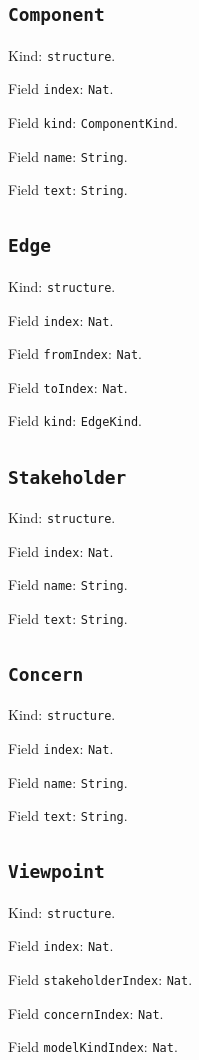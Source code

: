 \documentclass[11pt]{article}
\begin{document}
\subsection*{\texttt{Component}}
\noindent Kind: \texttt{structure}.\par
\noindent Field \texttt{index}: \texttt{Nat}.\par
\noindent Field \texttt{kind}: \texttt{ComponentKind}.\par
\noindent Field \texttt{name}: \texttt{String}.\par
\noindent Field \texttt{text}: \texttt{String}.\par
\subsection*{\texttt{Edge}}
\noindent Kind: \texttt{structure}.\par
\noindent Field \texttt{index}: \texttt{Nat}.\par
\noindent Field \texttt{fromIndex}: \texttt{Nat}.\par
\noindent Field \texttt{toIndex}: \texttt{Nat}.\par
\noindent Field \texttt{kind}: \texttt{EdgeKind}.\par
\subsection*{\texttt{Stakeholder}}
\noindent Kind: \texttt{structure}.\par
\noindent Field \texttt{index}: \texttt{Nat}.\par
\noindent Field \texttt{name}: \texttt{String}.\par
\noindent Field \texttt{text}: \texttt{String}.\par
\subsection*{\texttt{Concern}}
\noindent Kind: \texttt{structure}.\par
\noindent Field \texttt{index}: \texttt{Nat}.\par
\noindent Field \texttt{name}: \texttt{String}.\par
\noindent Field \texttt{text}: \texttt{String}.\par
\subsection*{\texttt{Viewpoint}}
\noindent Kind: \texttt{structure}.\par
\noindent Field \texttt{index}: \texttt{Nat}.\par
\noindent Field \texttt{stakeholderIndex}: \texttt{Nat}.\par
\noindent Field \texttt{concernIndex}: \texttt{Nat}.\par
\noindent Field \texttt{modelKindIndex}: \texttt{Nat}.\par
\end{document}

